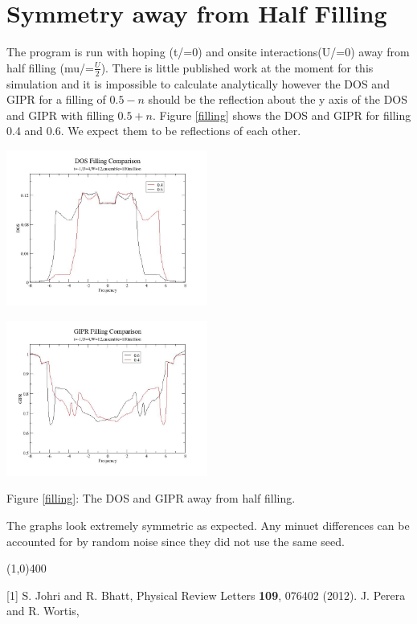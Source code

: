 \documentclass{article}
\begin{document}
\section{Symmetry away from Half Filling}
The program is run with hoping (t/=0) and onsite interactions(U/=0) away from half filling (mu/=$\frac{U}{2}$). There is little published work at the moment for this simulation and it is impossible to calculate analytically however the DOS and GIPR for a filling of $0.5-n$ should be the reflection about the y axis of the DOS and GIPR with filling $0.5+n$. Figure \ref{filling} shows the DOS and GIPR for filling 0.4 and 0.6. We expect them to be reflections of each other.
\begin{multicols}{2}
\begin{center}
	\includegraphics[width=250px]{dos_comparef.jpg} \\ \label{filling}
\end{center}
\begin{center}
	\includegraphics[width=250px]{gipr_comparef.jpg} \\
\end{center}
\end{multicols}
\begin{center}
Figure \ref{filling}: The DOS and GIPR away from half filling. 
\end{center}
The graphs look extremely symmetric as expected. Any minuet differences can be accounted for by random noise since they did not use the same seed. 
\begin{center}
	\line(1,0){400}
\end{center}
[1] S. Johri and R. Bhatt, Physical Review Letters \textbf{109}, 076402 (2012). \newline
[2] J. Perera and R. Wortis,
\end{document}
